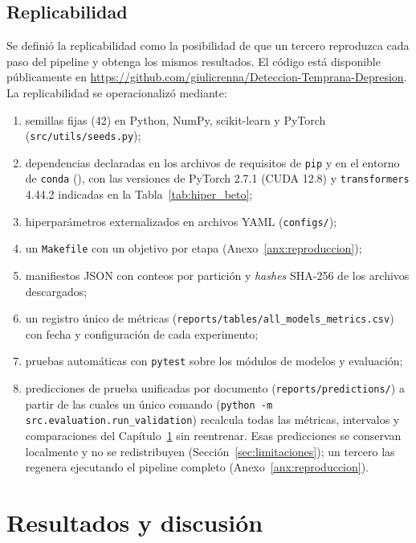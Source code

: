 \documentclass[12pt,a4paper]{article}
\begin{document}
\subsection{Replicabilidad}
\label{sec:replicabilidad}
Se definió la replicabilidad como la posibilidad de que un tercero reproduzca cada paso del pipeline y obtenga los mismos resultados. El código está disponible públicamente en \url{https://github.com/giulicrenna/Deteccion-Temprana-Depresion}. La replicabilidad se operacionalizó mediante:
\begin{enumerate}[leftmargin=2em]
    \item semillas fijas (42) en Python, NumPy, scikit-learn y PyTorch (\texttt{src/utils/seeds.py});
    \item dependencias declaradas en los archivos de requisitos de \texttt{pip} y en el entorno de \texttt{conda} (), con las versiones de PyTorch 2.7.1 (CUDA 12.8) y \texttt{transformers} 4.44.2 indicadas en la Tabla~\ref{tab:hiper_beto};
    \item hiperparámetros externalizados en archivos YAML (\texttt{configs/});
    \item un \texttt{Makefile} con un objetivo por etapa (Anexo~\ref{anx:reproduccion});
    \item manifiestos JSON con conteos por partición y \emph{hashes} SHA-256 de los archivos descargados;
    \item un registro único de métricas (\texttt{reports/tables/all\_models\_metrics.csv}) con fecha y configuración de cada experimento;
    \item pruebas automáticas con \texttt{pytest} sobre los módulos de modelos y evaluación;
    \item predicciones de prueba unificadas por documento (\texttt{reports/predictions/}) a partir de las cuales un único comando (\texttt{python -m src.evaluation.run\_validation}) recalcula todas las métricas, intervalos y comparaciones del Capítulo~\ref{sec:resultados} sin reentrenar. Esas predicciones se conservan localmente y no se redistribuyen (Sección~\ref{sec:limitaciones}); un tercero las regenera ejecutando el pipeline completo (Anexo~\ref{anx:reproduccion}).
\end{enumerate}

\newpage
\section{Resultados y discusión}
\label{sec:resultados}
\end{document}
